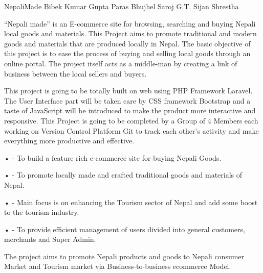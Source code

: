  \begin{conf-abstract}[]
 {NepaliMade}
 {Bibek Kumar Gupta
 	Paras Bhujhel
 	Saroj G.T.
 	Sijan Shrestha
 }
{}

“Nepali made” is an E-commerce site for browsing, searching and buying Nepali local goods and materials. This Project aims to promote traditional and modern goods and materials that are produced locally in Nepal. The basic objective of this project is to ease the process of buying and selling local goods through an online portal. The project itself acts as a middle-man by creating a link of business between the local sellers and buyers. 

This project is going to be totally built on web using PHP Framework Laravel. The User Interface part will be taken care by CSS framework Bootstrap and a taste of JavaScript will be introduced to make the product more interactive and responsive. This Project is going to be completed by a Group of 4 Members each working on Version Control Platform Git to track each other’s activity and make everything more productive and effective. 

•	- To build a feature rich e-commerce site for buying Nepali Goods.

•	- To promote locally made and crafted traditional goods and materials of Nepal.

•	- Main focus is on enhancing the Tourism sector of Nepal and add some boost to the tourism industry.

•	- To provide efficient management of users divided into general customers, merchants and Super Admin.

The project aims to promote Nepali products and goods to Nepali consumer Market and Tourism market via Business-to-business ecommerce Model.
\end{conf-abstract}